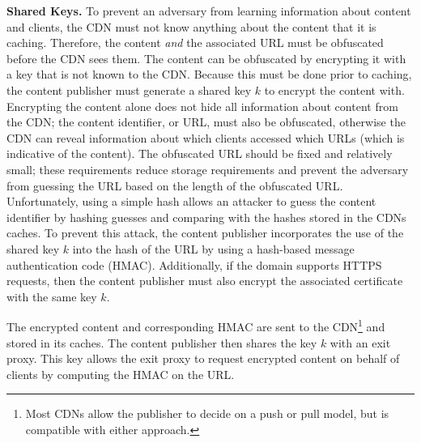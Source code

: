 
\textbf{Shared Keys.} 
To prevent an adversary from learning information about content and clients, the CDN must not know anything
about the
content that it is caching.  Therefore, the content {\it and} the associated URL
must be obfuscated
before the CDN sees them.  The content can be obfuscated by encrypting it with a
key that is not
known to the CDN.  Because this must be done prior to caching, the content publisher must 
generate a shared key $k$ to encrypt the content with. Encrypting the content alone does not 
hide all information about content from the CDN; the content identifier, or URL, must also be obfuscated, otherwise the 
CDN can reveal information about which clients accessed which URLs (which is indicative 
of the content).  The obfuscated URL should be fixed and relatively
small; 
these requirements reduce storage requirements and prevent the adversary from guessing
the
URL based on the length of the obfuscated URL.  Unfortunately, using a simple hash allows an 
attacker to guess the content identifier by hashing guesses and comparing with 
the hashes stored in the CDNs caches.  To prevent this attack, the content publisher incorporates the use 
of the shared key $k$ into the hash of the URL by using a hash-based message authentication code 
(HMAC).  Additionally, if the domain supports HTTPS requests, then the content publisher must 
also encrypt the associated certificate with the same key $k$.

The encrypted content and corresponding HMAC are sent to the CDN\footnote{Most CDNs
allow the publisher to
decide on a push or pull model, but \system{} is compatible with either approach.}
and stored in
its caches.  The content publisher then shares the key $k$ with an exit proxy. 
This key allows the 
exit proxy to request encrypted content on behalf of clients by computing the HMAC on the URL.  

